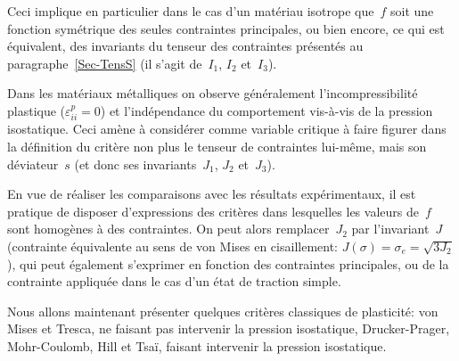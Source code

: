  Ceci implique en particulier dans le cas d'un matériau isotrope que~$f$ soit une fonction symétrique des seules contraintes principales, ou bien encore, ce qui est équivalent, des invariants du tenseur des contraintes présentés au paragraphe~\ref{Sec-TensS} (il s'agit de~$I_1$, $I_2$ et~$I_3$).

\medskip
Dans les matériaux métalliques on observe généralement l'incompressibilité plastique ($\varepsilon^p_{ii} = 0$) et l'indépendance du comportement vis-à-vis de la pression isostatique. Ceci amène à considérer comme variable critique à faire figurer dans la définition du critère non plus le tenseur de contraintes lui-même, mais son déviateur~$s$ (et donc ses invariants~$J_1$, $J_2$ et~$J_3$).

En vue de réaliser les comparaisons avec les résultats expérimentaux, il est pratique de disposer d'expressions des critères dans lesquelles les valeurs de~$f$ sont homogènes à des contraintes. On peut alors remplacer~$J_2$ par l'invariant~$J$ (contrainte équivalente au sens de von Mises en cisaillement: $J(\sigma)=\sigma_e= \sqrt{3J_2}$), qui peut également s'exprimer en fonction des contraintes principales, ou de la contrainte appliquée dans le cas d'un état de traction simple.

\medskip
Nous allons maintenant présenter quelques critères classiques de plasticité: von Mises et Tresca, ne faisant pas intervenir la pression isostatique, Drucker-Prager, Mohr-Coulomb, Hill et Tsaï, faisant intervenir la pression isostatique.


